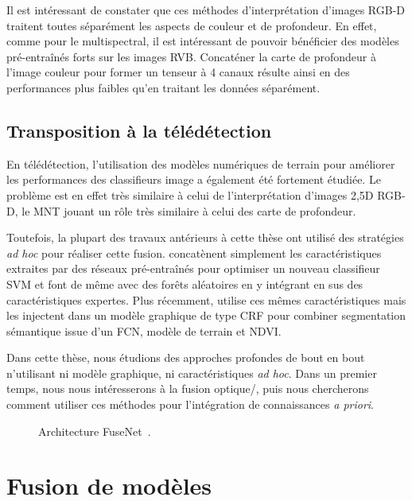 Il est intéressant de constater que ces méthodes d'interprétation d'images \gls{RGB-D} traitent toutes séparément les aspects de couleur et de profondeur. En effet, comme pour le multispectral, il est intéressant de pouvoir bénéficier des modèles pré-entraînés forts sur les images \gls{RVB}. Concaténer la carte de profondeur à l'image couleur pour former un tenseur à 4 canaux résulte ainsi en des performances plus faibles qu'en traitant les données séparément.

\subsection{Transposition à la télédétection}

En télédétection, l'utilisation des modèles numériques de terrain pour améliorer les performances des classifieurs image a également été fortement étudiée. Le problème est en effet très similaire à celui de l'interprétation d'images 2,5D \gls{RGB-D}, le \gls{MNT} jouant un rôle très similaire à celui des carte de profondeur.

Toutefois, la plupart des travaux antérieurs à cette thèse ont utilisé des stratégies \emph{ad hoc} pour réaliser cette fusion. \citet{lagrange_benchmarking_2015} concatènent simplement les caractéristiques extraites par des réseaux pré-entraînés pour optimiser un nouveau classifieur \gls{SVM} et \citet{paisitkriangkrai_effective_2015} font de même avec des forêts aléatoires en y intégrant en sus des caractéristiques expertes. Plus récemment, \cite{liu_dense_2017} utilise ces mêmes caractéristiques mais les injectent dans un modèle graphique de type \gls{CRF} pour combiner segmentation sémantique issue d'un \gls{FCN}, modèle de terrain et \gls{NDVI}.

Dans cette thèse, nous étudions des approches profondes de bout en bout n'utilisant ni modèle graphique, ni caractéristiques \emph{ad hoc}. Dans un premier temps, nous nous intéresserons à la fusion optique/, puis nous chercherons comment utiliser ces méthodes pour l'intégration de connaissances \emph{a priori}.

\begin{figure}[h]
    \resizebox{\textwidth}{!}{}
    \caption[Architecture FuseNet.]{Architecture FuseNet~\cite{hazirbas_fusenet_2016}.}
    \label{fig:fusenet}
\end{figure}

\section{Fusion de modèles}

